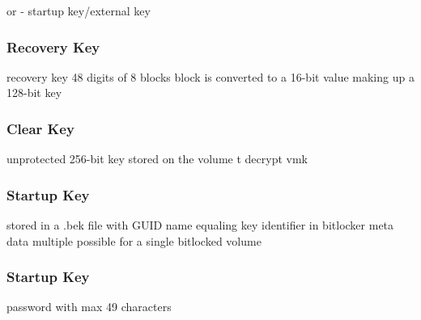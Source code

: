 or
- startup key/external key

\subsubsection{Recovery Key}
recovery key 48 digits of 8 blocks
block is converted to a 16-bit value making up a 128-bit key

\subsubsection{Clear Key}
unprotected 256-bit key stored on the volume t decrypt vmk

\subsubsection{Startup Key}
stored in a .bek file with GUID name equaling key identifier in bitlocker meta data
multiple possible for a single bitlocked volume

\subsubsection{Startup Key}
password with max 49 characters